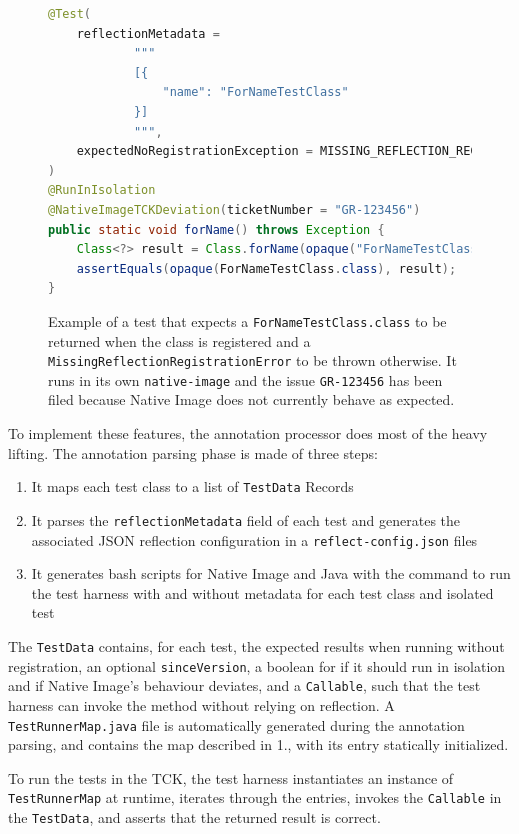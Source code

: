 \begin{figure}[ht]
    \centering
\begin{lstlisting}[language=Java]
@Test(
    reflectionMetadata =
            """
            [{
                "name": "ForNameTestClass"
            }]
            """,
    expectedNoRegistrationException = MISSING_REFLECTION_REGISTRATION_ERROR
)
@RunInIsolation
@NativeImageTCKDeviation(ticketNumber = "GR-123456")
public static void forName() throws Exception {
    Class<?> result = Class.forName(opaque("ForNameTestClass"));
    assertEquals(opaque(ForNameTestClass.class), result);
}
\end{lstlisting}
    \caption{Example of a test that expects a \texttt{ForNameTestClass.class} to be returned when the class is registered and a \texttt{MissingReflectionRegistrationError} to be thrown otherwise. It runs in its own \texttt{native-image} and the issue \texttt{GR-123456} has been filed because Native Image does not currently behave as expected.}
    \label{fig:tck_for_name}
\end{figure}

To implement these features, the annotation processor does most of the heavy lifting. The annotation parsing phase is made of three steps:
\begin{enumerate}
    \item It maps each test class to a list of \verb|TestData| Records 
    \item It parses the \verb|reflectionMetadata| field of each test and generates the associated JSON reflection configuration in a \verb|reflect-config.json| files
    \item It generates bash scripts for Native Image and Java with the command to run the test harness with and without metadata for each test class and isolated test
\end{enumerate}
The \verb|TestData| contains, for each test, the expected results when running without registration, an optional \verb|sinceVersion|, a boolean for if it should run in isolation and if Native Image's behaviour deviates, and a \verb|Callable|, such that the test harness can invoke the method without relying on reflection.  
A \verb|TestRunnerMap.java| file is automatically generated during the annotation parsing, and contains the map described in 1., with its entry statically initialized. 

To run the tests in the TCK, the test harness instantiates an instance of \verb|TestRunnerMap| at runtime, iterates through the entries, invokes the \verb|Callable| in the \verb|TestData|, and asserts that the returned result is correct.

